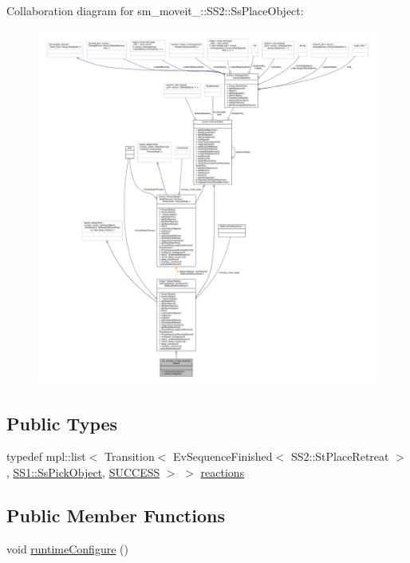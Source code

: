Collaboration diagram for sm\+\_\+moveit\+\_\+:\+:S\+S2\+:\+:Ss\+Place\+Object\+:
\nopagebreak
\begin{figure}[H]
\begin{center}
\leavevmode
\includegraphics[width=350pt]{structsm__moveit__2_1_1SS2_1_1SsPlaceObject__coll__graph}
\end{center}
\end{figure}
\subsection*{Public Types}
\begin{DoxyCompactItemize}
\item 
typedef mpl\+::list$<$ Transition$<$ Ev\+Sequence\+Finished$<$ S\+S2\+::\+St\+Place\+Retreat $>$, \hyperlink{structsm__moveit__2_1_1SS1_1_1SsPickObject}{S\+S1\+::\+Ss\+Pick\+Object}, \hyperlink{classSUCCESS}{S\+U\+C\+C\+E\+SS} $>$ $>$ \hyperlink{structsm__moveit__2_1_1SS2_1_1SsPlaceObject_ae09c14fe43a562aecf7d4aed604adb10}{reactions}
\end{DoxyCompactItemize}
\subsection*{Public Member Functions}
\begin{DoxyCompactItemize}
\item 
void \hyperlink{structsm__moveit__2_1_1SS2_1_1SsPlaceObject_a6b8d13a4eaf0db3eb8a691ab6a15969f}{runtime\+Configure} ()
\end{DoxyCompactItemize}
